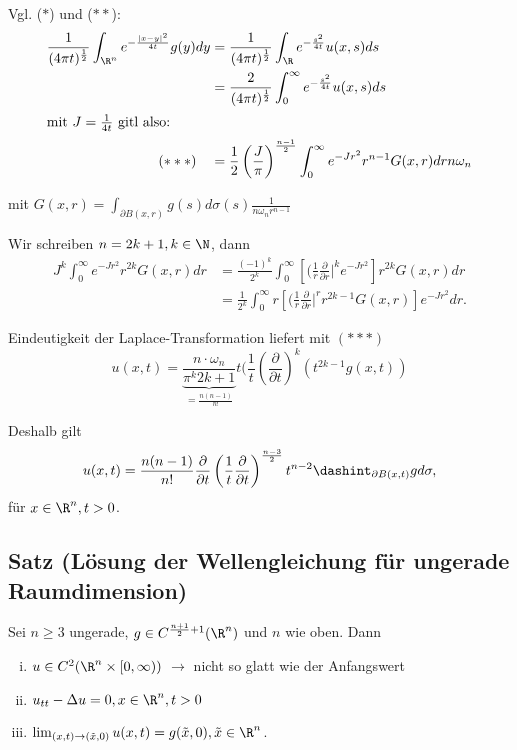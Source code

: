 Vgl. ($\ast$) und ($\ast\ast$):
\begin{align*}
\frac{1}{(4\pi t)^{\frac{1}{2}}} \int_{\R^n} e^{-\frac{|x - y|^2}{4t}} g(y) dy
&= \frac{1}{(4 \pi t)^{\frac{1}{2}}} \int_\R e^{-\frac{s^2}{4t}} u(x, s) ds \\
&= \frac{2}{(4\pi t)^{\frac{1}{2}}} \int_0^\infty e^{-\frac{s^2}{4t}} u(x,s) ds\\
\intertext{mit $J = \frac{1}{4t}$ gitl also:}
(\ast\ast\ast) \quad &= \frac{1}{2} \left(\frac{J}{\pi}\right)^{\frac{n - 1}{2}} \int_0^\infty e^{-Jr^2} r^{n - 1} G(x,r) dr n \omega_n
\end{align*}

mit $G(x,r) = \int_{\partial B(x,r)} g(s) d\sigma(s) \frac{1}{n \omega_n r^{n - 1}}$

Wir schreiben $n = 2k + 1, k \in \N$, dann
\begin{align*}
J^k \int_0^\infty e^{-J r^2} r^{2k} G(x,r) dr 
&= \frac{(-1)^k}{2^k} \int_0^\infty \left[ (\frac{1}{r}\frac{\partial}{\partial r}|^k e^{-Jr^2} \right] r^{2k} G(x,r) dr \\
&= \frac{1}{2^k} \int_0^\infty r\left[(\frac{1}{r} \frac{\partial}{\partial r}|^r r^{2k - 1} G(x, r) \right] e^{-Jr^2} dr.
\end{align*}

Eindeutigkeit der Laplace-Transformation liefert mit $(\ast\ast\ast)$
$$
u(x, t) = \underbrace{\frac{n \cdot \omega_n}{\pi^k 2{k + 1}}}_{= \frac{n(n - 1)}{n!}} t (\frac{1}{t} (\frac{\partial }{\partial t})^k (t^{2k - 1} g(x,t))
$$

Deshalb gilt
$$
u(x,t) = \frac{n(n -1)}{n!} \frac{\partial}{\partial t} \left(\frac{1}{t} \frac{\partial}{\partial t}\right)^{\frac{ n -3}{2}} t^{n - 2} \dashint_{\partial B(x, t)} g d\sigma,
$$
für $x \in \R^n, t > 0$.

\subsection{Satz (Lösung der Wellengleichung für ungerade Raumdimension)}

Sei $n \geq 3$ ungerade, $g \in C^{\frac{n + 1}{2} + 1}(\R^n)$ und $n $ wie oben. Dann
\begin{enumerate}[(i)]
\item $u \in C^2(\R^n \times [0 , \infty))$ $\to$ nicht so glatt wie der Anfangswert
\item $u_{tt} - \Delta u  = 0, x \in \R^n, t > 0$
\item $\lim_{(x, t) \to (\tilde x, 0)} u(x,t) = g(\tilde x, 0), \tilde x \in \R^n$.
\end{enumerate}

